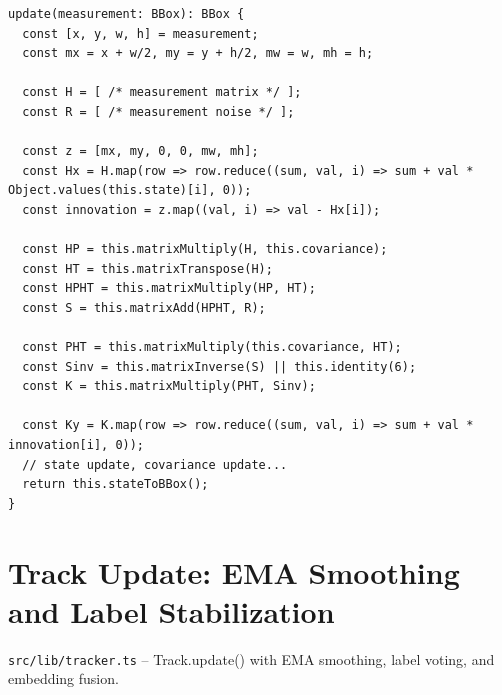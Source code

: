 \begin{lstlisting}[style=typescript, caption={KalmanFilter.update()}, label={lst:kf-update}]
update(measurement: BBox): BBox {
  const [x, y, w, h] = measurement;
  const mx = x + w/2, my = y + h/2, mw = w, mh = h;

  const H = [ /* measurement matrix */ ];
  const R = [ /* measurement noise */ ];

  const z = [mx, my, 0, 0, mw, mh];
  const Hx = H.map(row => row.reduce((sum, val, i) => sum + val * Object.values(this.state)[i], 0));
  const innovation = z.map((val, i) => val - Hx[i]);

  const HP = this.matrixMultiply(H, this.covariance);
  const HT = this.matrixTranspose(H);
  const HPHT = this.matrixMultiply(HP, HT);
  const S = this.matrixAdd(HPHT, R);

  const PHT = this.matrixMultiply(this.covariance, HT);
  const Sinv = this.matrixInverse(S) || this.identity(6);
  const K = this.matrixMultiply(PHT, Sinv);

  const Ky = K.map(row => row.reduce((sum, val, i) => sum + val * innovation[i], 0));
  // state update, covariance update...
  return this.stateToBBox();
}
\end{lstlisting}

\section{Track Update: EMA Smoothing and Label Stabilization}
\label{sec:code-track-update}
\texttt{src/lib/tracker.ts} -- Track.update() with EMA smoothing, label voting, and embedding fusion.

